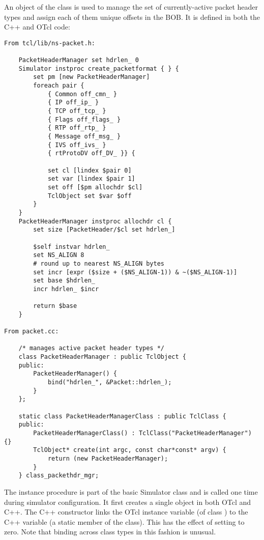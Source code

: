 An object of the class  is used
to manage the set of currently-active packet header types and
assign each of them unique offsets in the BOB.
It is defined in both the C++ and OTcl code:
\begin{small}
\begin{verbatim}
From tcl/lib/ns-packet.h:

	PacketHeaderManager set hdrlen_ 0
	Simulator instproc create_packetformat { } {
		set pm [new PacketHeaderManager]
		foreach pair {
			{ Common off_cmn_ }
			{ IP off_ip_ }
			{ TCP off_tcp_ }
			{ Flags off_flags_ }
			{ RTP off_rtp_ } 
			{ Message off_msg_ }
			{ IVS off_ivs_ }
			{ rtProtoDV off_DV_ }} {

			set cl [lindex $pair 0]
			set var [lindex $pair 1]
			set off [$pm allochdr $cl]
			TclObject set $var $off
		}
	}
	PacketHeaderManager instproc allochdr cl {
		set size [PacketHeader/$cl set hdrlen_]

		$self instvar hdrlen_
		set NS_ALIGN 8
		# round up to nearest NS_ALIGN bytes
		set incr [expr ($size + ($NS_ALIGN-1)) & ~($NS_ALIGN-1)]
		set base $hdrlen_
		incr hdrlen_ $incr

		return $base
	}

From packet.cc:

	/* manages active packet header types */
	class PacketHeaderManager : public TclObject {
	public:
		PacketHeaderManager() {
			bind("hdrlen_", &Packet::hdrlen_);
		}
	};

	static class PacketHeaderManagerClass : public TclClass {
	public:
		PacketHeaderManagerClass() : TclClass("PacketHeaderManager") {}
		TclObject* create(int argc, const char*const* argv) {
			return (new PacketHeaderManager);
		}
	} class_packethdr_mgr;

\end{verbatim}
\end{small}
The  instance procedure is part of the
basic Simulator class and is called one time during simulator
configuration.
It first creates a single  object
in both OTcl and C++.
The C++ constructor links the OTcl instance
variable  (of class )
to the C++ variable  (a static
member of the  class).
This has the effect of setting  to
zero.
Note that binding across class types in this fashion is
unusual.

